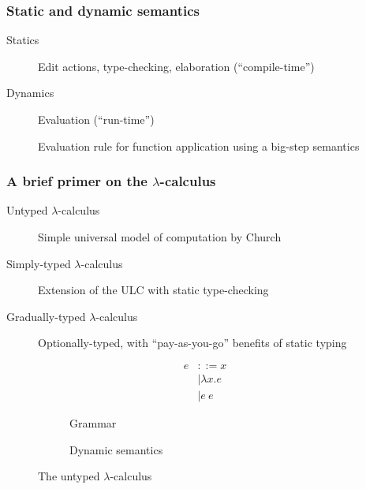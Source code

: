 \documentclass{beamer}
\begin{document}
\begin{frame}
  \frametitle{Static and dynamic semantics}

  \begin{description}
  \item[Statics] Edit actions, type-checking, elaboration (``compile-time'')
  \item[Dynamics] Evaluation (``run-time'')
  \end{description}

  \begin{figure}
    \centering
    \begin{mathpar}
    \end{mathpar}
    \caption{Evaluation rule for function application using a big-step semantics}
    \label{fig:inference-rules}
  \end{figure}
\end{frame}

\begin{frame}
  \frametitle{A brief primer on the $\lambda$-calculus}

  \begin{description}
  \item[Untyped $\lambda$-calculus] Simple universal model of computation by Church
  \item[Simply-typed $\lambda$-calculus] Extension of the ULC with static type-checking
  \item[Gradually-typed $\lambda$-calculus] Optionally-typed, with ``pay-as-you-go'' benefits of static typing
  \end{description}

  \begin{figure}
    \centering
    \begin{subfigure}[b]{.2\textwidth}
        \begin{align*}
          e &::= x\\
            &\mid \lambda x.e\\
            &\mid e\ e
        \end{align*}
      \caption{Grammar}
    \end{subfigure}\qquad
    \begin{subfigure}[b]{.7\textwidth}
      
      \caption{Dynamic semantics}
    \end{subfigure}
    \caption{The untyped $\lambda$-calculus}
    \label{fig:ulc}
  \end{figure}
\end{frame}
\end{document}
